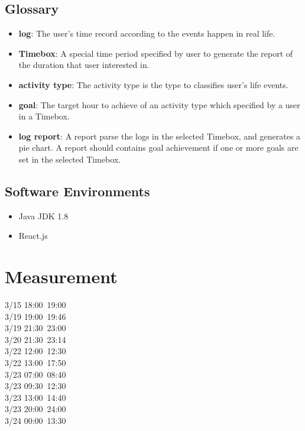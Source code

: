\documentclass[12pt, a4paper]{article}
\begin{document}
\begin{CJK*}{UTF8}{bkai}
  \subsection{Glossary}
  \begin{itemize}
    \item {\bf log}: The user's time record according to the events happen in real life.
    \item {\bf Timebox}: A special time period specified by user to generate the report of the duration that user interested in.
    \item {\bf activity type}: The activity type is the type to classifies user's life events.
    \item {\bf goal}: The target hour to achieve of an activity type which specified by a user in a Timebox.
    \item {\bf log report}: A report parse the logs in the selected Timebox, and generates a pie chart. A report should contains goal achievement if one or more goals are set in the selected Timebox.
  \end{itemize}

  \subsection{Software Environments}
    \begin{itemize}
      \item Java JDK 1.8
      \item React.js
    \end{itemize}

\section{Measurement}
3/15 18:00~19:00\\
3/19 19:00~19:46\\
3/19 21:30~23:00\\
3/20 21:30~23:14\\
3/22 12:00~12:30\\
3/22 13:00~17:50\\
3/23 07:00~08:40\\
3/23 09:30~12:30\\
3/23 13:00~14:40\\
3/23 20:00~24:00\\
3/24 00:00~13:30


\end{CJK*}
\end{document}
